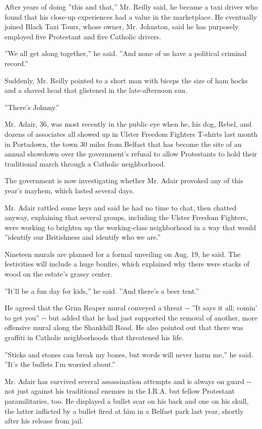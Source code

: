 After years of doing ''this and that,'' Mr. Reilly said, he became a
taxi driver who found that his close-up experiences had a value in the
marketplace. He eventually joined Black Taxi Tours, whose owner, Mr.
Johnston, said he has purposely employed five Protestant and five
Catholic drivers.

''We all get along together,'' he said. ''And none of us have a
political criminal record.''

Suddenly, Mr. Reilly pointed to a short man with biceps the size of ham
hocks and a shaved head that glistened in the late-afternoon sun.

''There's Johnny.''

Mr. Adair, 36, was most recently in the public eye when he, his dog,
Rebel, and dozens of associates all showed up in Ulster Freedom Fighters
T-shirts last month in Portadown, the town 30 miles from Belfast that
has become the site of an annual showdown over the government's refusal
to allow Protestants to hold their traditional march through a Catholic
neighborhood.

The government is now investigating whether Mr. Adair provoked any of
this year's mayhem, which lasted several days.

Mr. Adair rattled some keys and said he had no time to chat, then
chatted anyway, explaining that several groups, including the Ulster
Freedom Fighters, were working to brighten up the working-class
neighborhood in a way that would ''identify our Britishness and identify
who we are.''

Nineteen murals are planned for a formal unveiling on Aug. 19, he said.
The festivities will include a huge bonfire, which explained why there
were stacks of wood on the estate's grassy center.

''It'll be a fun day for kids,'' he said. ''And there's a beer tent.''

He agreed that the Grim Reaper mural conveyed a threat -\/- ''It says it
all; comin' to get you'' -\/- but added that he had just supported the
removal of another, more offensive mural along the Shankhill Road. He
also pointed out that there was graffiti in Catholic neighborhoods that
threatened his life.

''Sticks and stones can break my bones, but words will never harm me,''
he said. ''It's the bullets I'm worried about.''

Mr. Adair has survived several assassination attempts and is always on
guard -\/- not just against his traditional enemies in the I.R.A. but
fellow Protestant paramilitaries, too. He displayed a bullet scar on his
back and one on his skull, the latter inflicted by a bullet fired at him
in a Belfast park last year, shortly after his release from jail.

